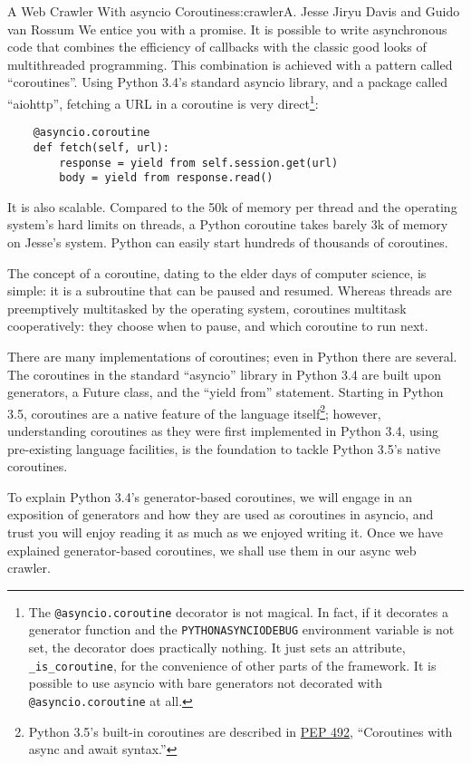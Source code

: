 \begin{aosachapter}{A Web Crawler With asyncio Coroutines}{s:crawler}{A. Jesse Jiryu Davis and Guido van Rossum}
We entice you with a promise. It is possible to write asynchronous code
that combines the efficiency of callbacks with the classic good looks of
multithreaded programming. This combination is achieved with a pattern
called ``coroutines''. Using Python 3.4's standard asyncio library, and
a package called ``aiohttp'', fetching a URL in a coroutine is very
direct\footnote{The \texttt{@asyncio.coroutine} decorator is not
  magical. In fact, if it decorates a generator function and the
  \texttt{PYTHONASYNCIODEBUG} environment variable is not set, the
  decorator does practically nothing. It just sets an attribute,
  \texttt{\_is\_coroutine}, for the convenience of other parts of the
  framework. It is possible to use asyncio with bare generators not
  decorated with \texttt{@asyncio.coroutine} at all.}:

\begin{verbatim}
    @asyncio.coroutine
    def fetch(self, url):
        response = yield from self.session.get(url)
        body = yield from response.read()
\end{verbatim}

It is also scalable. Compared to the 50k of memory per thread and the
operating system's hard limits on threads, a Python coroutine takes
barely 3k of memory on Jesse's system. Python can easily start hundreds
of thousands of coroutines.

The concept of a coroutine, dating to the elder days of computer
science, is simple: it is a subroutine that can be paused and resumed.
Whereas threads are preemptively multitasked by the operating system,
coroutines multitask cooperatively: they choose when to pause, and which
coroutine to run next.

There are many implementations of coroutines; even in Python there are
several. The coroutines in the standard ``asyncio'' library in Python
3.4 are built upon generators, a Future class, and the ``yield from''
statement. Starting in Python 3.5, coroutines are a native feature of
the language itself\footnote{Python 3.5's built-in coroutines are
  described in \href{https://www.python.org/dev/peps/pep-0492/}{PEP
  492}, ``Coroutines with async and await syntax.''}; however,
understanding coroutines as they were first implemented in Python 3.4,
using pre-existing language facilities, is the foundation to tackle
Python 3.5's native coroutines.

To explain Python 3.4's generator-based coroutines, we will engage in an
exposition of generators and how they are used as coroutines in asyncio,
and trust you will enjoy reading it as much as we enjoyed writing it.
Once we have explained generator-based coroutines, we shall use them in
our async web crawler.


\end{aosachapter}
